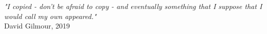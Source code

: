 \documentclass[a4paper,11pt,oneside]{book}
\numberwithin{equation}{section}
\begin{document}
\vspace*{\fill}
\begin{flushright}
    \Large{
    \textit{"I copied - don't be afraid to copy - and eventually something that I suppose that I would call my own appeared."} \\ \vspace{0.5cm}
            David Gilmour, 2019
            }
\end{flushright}
\vfill

\newpage
\thispagestyle{empty}
$\phantom{blankpage}$ 


\newpage
{}
\setcounter{page}{6}




\newpage
\thispagestyle{empty}
$\phantom{a}$ \vfill 


\newpage 






\newpage
\tableofcontents 


\newpage











 

\end{document}

